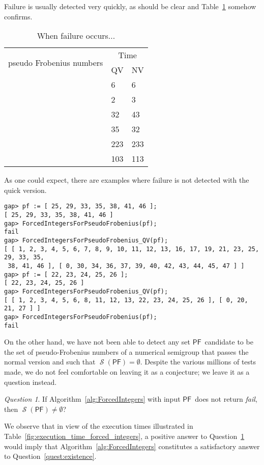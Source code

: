 \documentclass[11pt]{amsart}
\theoremstyle{remark}
\newtheorem{question}[theorem]{Question}
\begin{document}
Failure is usually detected very quickly, as should be clear and Table~\ref{fig:execution_time_failure} somehow confirms.

\begin{table}
\begin{center}
    \begin{tabular}{| l | l | l |}
    \hline
\multirow{2}{*}{pseudo Frobenius numbers}&\multicolumn{2}{|c|}{Time}\\ \cline{2-3}
                          &QV & NV\\ \hline
[ 18, 42, 58, 88, 94 ]&6&6\\ \hline
[ 20, 27, 34, 35, 37, 42, 48, 80 ]&2&3\\ \hline
[ 30, 104, 118, 147, 197, 292, 298, 315, 333, 384, 408 ]&32&43\\ \hline
[ 36, 37, 219, 233, 304, 410, 413, 431, 438, 458 ]&35&32\\ \hline
[ 89, 411, 446, 502, 557, 600, 605, 631, 636, 796, 801, 915 ]&223&233\\ \hline
[ 56, 134, 136, 137, 158, 248, 277, 373, 383, 389, 487, 558, 566, 621, 691, 825, 836 ]&103&113\\ \hline
    \end{tabular}
\end{center}
\caption{When failure occurs...\label{fig:execution_time_failure}}
\end{table}
As one could expect, there are examples where failure is not detected with the quick version.
\begin{verbatim}
gap> pf := [ 25, 29, 33, 35, 38, 41, 46 ];
[ 25, 29, 33, 35, 38, 41, 46 ]
gap> ForcedIntegersForPseudoFrobenius(pf);
fail
gap> ForcedIntegersForPseudoFrobenius_QV(pf);
[ [ 1, 2, 3, 4, 5, 6, 7, 8, 9, 10, 11, 12, 13, 16, 17, 19, 21, 23, 25, 29, 33, 35, 
 38, 41, 46 ], [ 0, 30, 34, 36, 37, 39, 40, 42, 43, 44, 45, 47 ] ]
gap> pf := [ 22, 23, 24, 25, 26 ];
[ 22, 23, 24, 25, 26 ]
gap> ForcedIntegersForPseudoFrobenius_QV(pf);
[ [ 1, 2, 3, 4, 5, 6, 8, 11, 12, 13, 22, 23, 24, 25, 26 ], [ 0, 20, 21, 27 ] ]
gap> ForcedIntegersForPseudoFrobenius(pf);
fail
\end{verbatim}

On the other hand, we have not been able to detect any set {\ensuremath{\mathsf{PF}}}\ candidate to be the set of pseudo-Frobenius numbers of a numerical semigroup that passes the normal version and such that $\operatorname{\mathcal{S}}({\ensuremath{\mathsf{PF}}})=\emptyset$. Despite the various millions of tests made, we do not feel comfortable on leaving it as a conjecture; we leave it as a question instead.
\begin{question}\label{quest:free_implies_nonempty}
If Algorithm~\ref{alg:ForcedIntegers} with input {\ensuremath{\mathsf{PF}}}\ does not return \emph{fail}, then $\operatorname{\mathcal{S}}({\ensuremath{\mathsf{PF}}})\ne\emptyset$?
\end{question}
We observe that in view of the execution times illustrated in Table~\ref{fig:execution_time_forced_integers}, a positive answer to Question~\ref{quest:free_implies_nonempty} would imply that Algorithm~\ref{alg:ForcedIntegers} constitutes a satisfactory answer to Question~\ref{quest:existence}. 
\end{document}
